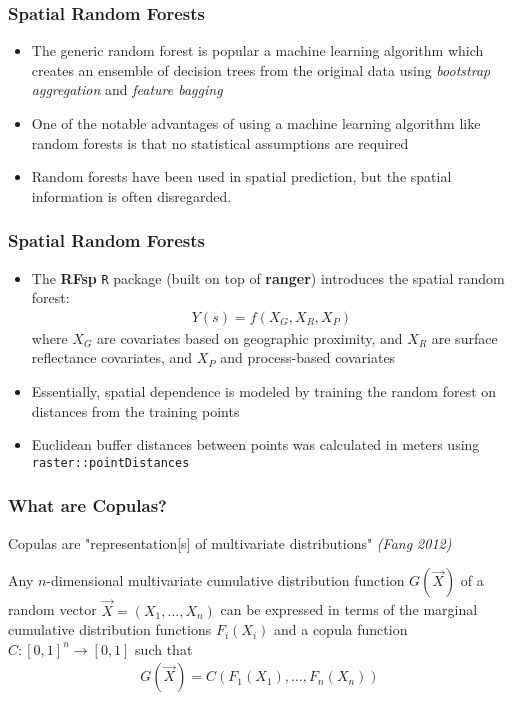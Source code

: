 \documentclass{beamer}
\begin{document}
\begin{frame}
	\frametitle{Spatial Random Forests}
	\begin{itemize}
		\item The generic random forest is popular a machine learning algorithm which creates an ensemble of decision trees from the original data using \textit{bootstrap aggregation} and \textit{feature bagging}
		\item One of the notable advantages of using a machine learning algorithm like random forests is that no statistical assumptions are required
		\item Random forests have been used in spatial prediction, but the spatial information is often disregarded\cite{hengl18}.
	\end{itemize}
\end{frame}

\begin{frame}
	\frametitle{Spatial Random Forests}
	\begin{itemize}
		\item The \textbf{RFsp} \texttt{R} package (built on top of \textbf{ranger}) introduces the spatial random forest:
		\begin{align*}
		Y(s) = f(X_G, X_R, X_P)
		\end{align*}
		where $X_G$ are covariates based on geographic proximity, and $X_R$ are surface reflectance covariates, and $X_P$ and process-based covariates
		\item Essentially, spatial dependence is modeled by training the random forest on distances from the training points
		\item Euclidean buffer distances between points was calculated in meters using \texttt{raster::pointDistances}
	\end{itemize}
\end{frame}

\begin{frame}
	\frametitle{What are Copulas?}
	Copulas are "representation[s] of multivariate distributions" \textit{(Fang 2012)}
	\begin{theorem}[Sklar]
	Any $n$-dimensional multivariate cumulative distribution function $G(\vec{X})$ of a random vector $\vec{X} = (X_1, \ldots ,X_n)$ can be expressed in terms of the marginal cumulative distribution functions $F_i(X_i)$ and a copula function $C: [0,1]^n \rightarrow [0,1]$ such that
		\begin{align*}
			G(\vec{X}) = C(F_1(X_1), \ldots, F_n(X_n))
		\end{align*}
	\end{theorem}
\end{frame}
\end{document}
